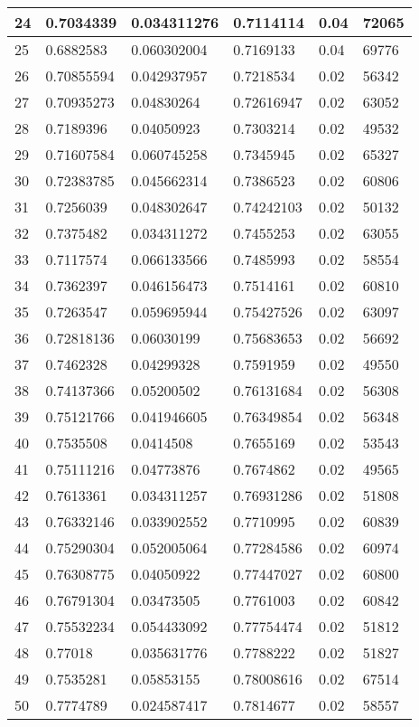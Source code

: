 \begin{longtable}{|l|l|l|l|l|l|}
24 & 0.7034339 & 0.034311276 & 0.7114114 & 0.04 & 72065 \\ \hline 
25 & 0.6882583 & 0.060302004 & 0.7169133 & 0.04 & 69776 \\ \hline 
26 & 0.70855594 & 0.042937957 & 0.7218534 & 0.02 & 56342 \\ \hline 
27 & 0.70935273 & 0.04830264 & 0.72616947 & 0.02 & 63052 \\ \hline 
28 & 0.7189396 & 0.04050923 & 0.7303214 & 0.02 & 49532 \\ \hline 
29 & 0.71607584 & 0.060745258 & 0.7345945 & 0.02 & 65327 \\ \hline 
30 & 0.72383785 & 0.045662314 & 0.7386523 & 0.02 & 60806 \\ \hline 
31 & 0.7256039 & 0.048302647 & 0.74242103 & 0.02 & 50132 \\ \hline 
32 & 0.7375482 & 0.034311272 & 0.7455253 & 0.02 & 63055 \\ \hline 
33 & 0.7117574 & 0.066133566 & 0.7485993 & 0.02 & 58554 \\ \hline 
34 & 0.7362397 & 0.046156473 & 0.7514161 & 0.02 & 60810 \\ \hline 
35 & 0.7263547 & 0.059695944 & 0.75427526 & 0.02 & 63097 \\ \hline 
36 & 0.72818136 & 0.06030199 & 0.75683653 & 0.02 & 56692 \\ \hline 
37 & 0.7462328 & 0.04299328 & 0.7591959 & 0.02 & 49550 \\ \hline 
38 & 0.74137366 & 0.05200502 & 0.76131684 & 0.02 & 56308 \\ \hline 
39 & 0.75121766 & 0.041946605 & 0.76349854 & 0.02 & 56348 \\ \hline 
40 & 0.7535508 & 0.0414508 & 0.7655169 & 0.02 & 53543 \\ \hline 
41 & 0.75111216 & 0.04773876 & 0.7674862 & 0.02 & 49565 \\ \hline 
42 & 0.7613361 & 0.034311257 & 0.76931286 & 0.02 & 51808 \\ \hline 
43 & 0.76332146 & 0.033902552 & 0.7710995 & 0.02 & 60839 \\ \hline 
44 & 0.75290304 & 0.052005064 & 0.77284586 & 0.02 & 60974 \\ \hline 
45 & 0.76308775 & 0.04050922 & 0.77447027 & 0.02 & 60800 \\ \hline 
46 & 0.76791304 & 0.03473505 & 0.7761003 & 0.02 & 60842 \\ \hline 
47 & 0.75532234 & 0.054433092 & 0.77754474 & 0.02 & 51812 \\ \hline 
48 & 0.77018 & 0.035631776 & 0.7788222 & 0.02 & 51827 \\ \hline 
49 & 0.7535281 & 0.05853155 & 0.78008616 & 0.02 & 67514 \\ \hline 
50 & 0.7774789 & 0.024587417 & 0.7814677 & 0.02 & 58557 \\ \hline 
\end{longtable}